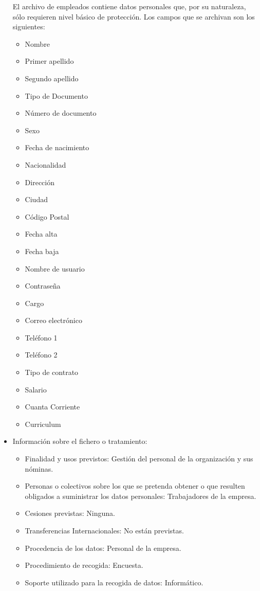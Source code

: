 \documentclass[a4paper,11pt,bibtotoc,noliststotoc]{scrbook}
\begin{document}
\begin{itemize}
El archivo de empleados contiene datos personales que, por su naturaleza, sólo requieren nivel básico de protección. Los campos que se archivan son los siguientes:
\begin{itemize}
\item Nombre
\item Primer apellido
\item Segundo apellido
\item Tipo de Documento
\item Número de documento
\item Sexo
\item Fecha de nacimiento
\item Nacionalidad
\item Dirección
\item Ciudad
\item Código Postal
\item Fecha alta
\item Fecha baja
\item Nombre de usuario
\item Contraseña
\item Cargo
\item Correo electrónico
\item Teléfono 1
\item Teléfono 2
\item Tipo de contrato
\item Salario
\item Cuanta Corriente
\item Curriculum
\end{itemize}


\item Información sobre el fichero o tratamiento:
	\begin{itemize}
	\item Finalidad y usos previstos: Gestión del personal de la organización y sus nóminas.
	\item Personas o colectivos sobre los que se pretenda obtener o que resulten obligados a suministrar los datos personales: Trabajadores de la empresa.
	\item Cesiones previstas: Ninguna.
	\item Transferencias Internacionales: No están previstas.
	\item Procedencia de los datos: Personal de la empresa.
	\item Procedimiento de recogida: Encuesta.
	\item Soporte utilizado para la recogida de datos: Informático.
	\end{itemize}


\end{itemize}
\end{document}
